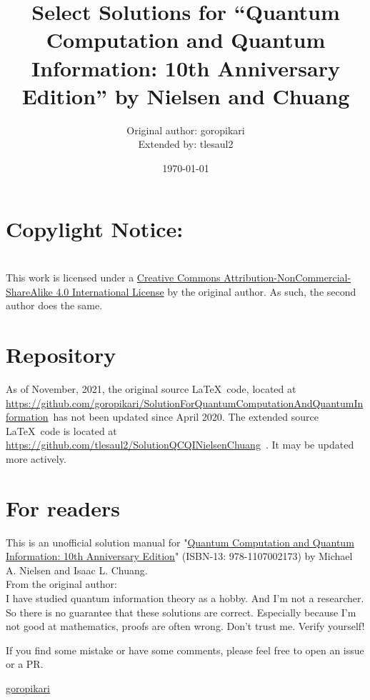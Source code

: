 \documentclass[11pt]{book}
\title{Select Solutions for ``Quantum Computation and Quantum Information: 10th Anniversary Edition'' by Nielsen and Chuang}
\author{Original author: goropikari\\Extended by: tlesaul2}
\date{\today}
\begin{document}
\maketitle
\thispagestyle{empty}
\cleardoublepage
\thispagestyle{empty}
\setcounter{page}{1} %

\section*{Copylight Notice:}
\ccbyncsa\\
    This work is licensed under a \href{http://creativecommons.org/licenses/by-nc-sa/4.0/}{Creative Commons Attribution-NonCommercial-ShareAlike 4.0 International License} by the original author.  As such, the second author does the same.


\section*{Repository}
As of November, 2021, the original source \LaTeX \ code, located at \url{https://github.com/goropikari/SolutionForQuantumComputationAndQuantumInformation}\ has not been updated since April 2020.  The extended source \LaTeX \ code is located at \\ \url{https://github.com/tlesaul2/SolutionQCQINielsenChuang}\ .  It may be updated more actively.

\section*{For readers}
This is an unofficial solution manual for "\href{http://www.cambridge.org/jp/academic/subjects/physics/quantum-physics-quantum-information-and-quantum-computation/quantum-computation-and-quantum-information-10th-anniversary-edition?format=HB&isbn=9781107002173#BBFv83H3ofgcgG3A.97}{Quantum Computation and Quantum Information: 10th Anniversary Edition}" (ISBN-13: 978-1107002173) by Michael A. Nielsen and Isaac L. Chuang.\\

\noindent From the original author:\\
\indent I have studied quantum information theory as a hobby.
And I'm not a researcher.
So there is no guarantee that these solutions are correct.
Especially because I'm not good at mathematics, proofs are often wrong.
Don't trust me. Verify yourself!

If you find some mistake or have some comments, please feel free to open an issue or a PR.
\begin{flushright}
\href{https://github.com/goropikari}{goropikari}\\
\end{flushright}
\end{document}
